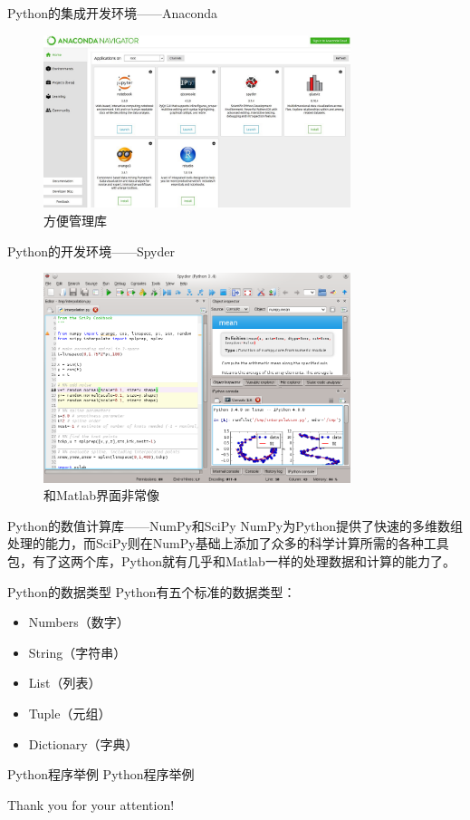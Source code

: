 \documentclass[xcolor=x11names,compress,10pt]{ctexbeamer}
\begin{document}
\begin{frame}{Python的集成开发环境——Anaconda}
\begin{figure}[h!]
\centering
\includegraphics[width=0.8\textwidth]{pictures/anaconda.jpeg}
\caption{方便管理库}
\end{figure}
\end{frame}


\begin{frame}{Python的开发环境——Spyder}
\begin{figure}[h!]
\centering
\includegraphics[width=0.8\textwidth]{pictures/Spyder.png}
\caption{和Matlab界面非常像}
\end{figure}
\end{frame}


\begin{frame}{Python的数值计算库——NumPy和SciPy}
NumPy为Python提供了快速的多维数组处理的能力，而SciPy则在NumPy基础上添加了众多的科学计算所需的各种工具包，有了这两个库，Python就有几乎和Matlab一样的处理数据和计算的能力了。
\end{frame}


\begin{frame}{Python的数据类型}
Python有五个标准的数据类型：
\begin{itemize}
\item Numbers（数字）
\item String（字符串）
\item List（列表）
\item Tuple（元组）
\item Dictionary（字典）
\end{itemize}
\end{frame}


\begin{frame}{Python程序举例}
\centering
Python程序举例
\end{frame}


\begin{frame}

{\huge Thank you for your attention!}

\end{frame}





\end{document}

